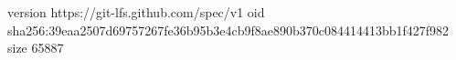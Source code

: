 version https://git-lfs.github.com/spec/v1
oid sha256:39eaa2507d69757267fe36b95b3e4cb9f8ae890b370c084414413bb1f427f982
size 65887
